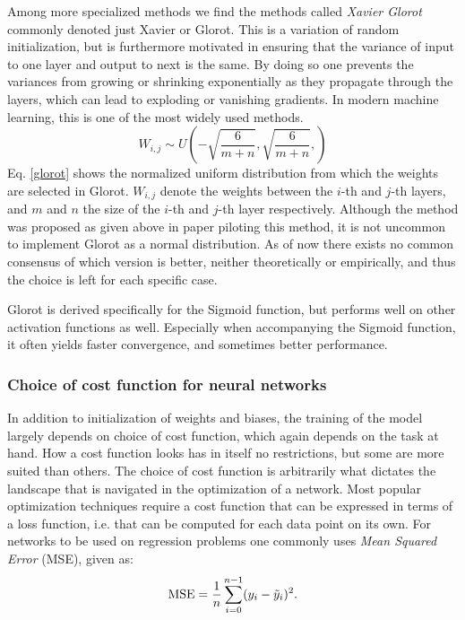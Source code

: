 Among more specialized methods we find the methods called \textit{Xavier Glorot} \cite{Glorot} commonly denoted just Xavier or Glorot. This is a variation of random initialization, but is furthermore motivated in ensuring that the variance of input to one layer and output to next is the same. By doing so one prevents the variances from growing or shrinking exponentially as they propagate through the layers, which can lead to exploding or vanishing gradients. In modern machine learning, this is one of the most widely used methods.
\begin{equation}\label{glorot}
    W_{i,j} \sim U\left(-\sqrt{\frac{6}{m+n}},{\sqrt{\frac{6}{m+n}}},\right)
\end{equation}
Eq. \ref{glorot} shows the normalized uniform distribution from which the weights are selected in Glorot. $W_{i,j}$ denote the weights between the $i$-th and $j$-th layers, and $m$ and $n$ the size of the $i$-th and $j$-th layer respectively. Although the method was proposed as given above in paper piloting this method, it is not uncommon to implement Glorot as a normal distribution. As of now there exists no common consensus of which version is better, neither theoretically or empirically, and thus the choice is left for each specific case.

Glorot is derived specifically for the Sigmoid function, but performs well on other activation functions as well. Especially when accompanying the Sigmoid function, it often yields faster convergence, and sometimes better performance.

\subsubsection{Choice of cost function for neural networks}
In addition to initialization of weights and biases, the training of the model largely depends on choice of cost function, which again depends on the task at hand. How a cost function looks has in itself no restrictions, but some are more suited than others.
The choice of cost function is arbitrarily what dictates the landscape that is navigated in the optimization of a network. Most popular optimization techniques require a cost function that can be expressed in terms of a loss function, i.e. that can be computed for each data point on its own. 
For networks to be used on regression problems one commonly uses \textit{Mean Squared Error} (MSE), given as: 
\begin{equation}\label{mse}
    \text{MSE} = \frac{1}{n}\sum_{i=0}^{n-1}(y_i-\Tilde{y}_i)^2.
\end{equation}

